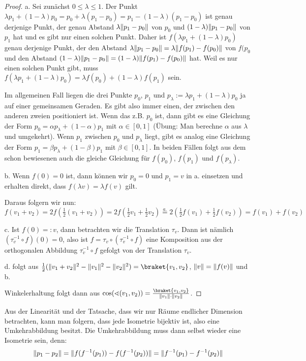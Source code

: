 \begin{proof}
a. Sei zunächst $0\leq \lambda\leq 1$. Der Punkt $\lambda p_1+(1-\lambda)p_0 = p_0+\lambda(p_1-p_0) = p_1-(1-\lambda)(p_1-p_0)$ ist genau derjenige Punkt, der genau Abstand $\lambda\lVert p_1-p_0\rVert$ von $p_0$ und $(1-\lambda)\lVert p_1-p_0\rVert$ von $p_1$ hat und es gibt nur einen solchen Punkt. Daher ist $f(\lambda p_1+(1-\lambda)p_0)$ genau derjenige Punkt, der den Abstand $\lambda\lVert p_1-p_0\rVert=\lambda\lVert f(p_1)-f(p_0)\rVert$ von $f(p_0$ und den Abstand $(1-\lambda)\lVert p_1-p_0\rVert = (1-\lambda)\lVert f(p_1)-f(p_0)\rVert$ hat. Weil es nur einen solchen Punkt gibt, muss $f(\lambda p_1+(1-\lambda)p_0) = \lambda f(p_0)+(1-\lambda)f(p_1)$ sein.

Im allgemeinen Fall liegen die drei Punkte $p_0$, $p_1$ und $p_\lambda:=\lambda p_1+(1-\lambda)p_0$ ja auf einer gemeinsamen Geraden. Es gibt also immer einen, der zwischen den anderen zweien positioniert ist. Wenn das z.B. $p_0$ ist, dann gibt es eine Gleichung der Form $p_0 = \alpha p_\lambda + (1-\alpha)p_1$ mit $\alpha\in [0,1]$ (Übung: Man berechne $\alpha$ aus $\lambda$ und umgekehrt). Wenn $p_1$ zwischen $p_0$ und $p_\lambda$ liegt, gibt es analog eine Gleichung der Form $p_1=\beta p_\lambda + (1-\beta)p_1$ mit $\beta\in[0,1]$. In beiden Fällen folgt aus dem schon bewiesenen auch die gleiche Gleichung für $f(p_0)$, $f(p_1)$ und $f(p_\lambda)$.

\medbreak
b. Wenn $f(0)=0$ ist, dann können wir $p_0=0$ und $p_1=v$ in a. einsetzen und erhalten direkt, dass $f(\lambda v)=\lambda f(v)$ gilt.

Daraus folgern wir nun:
\[f(v_1+v_2) = 2f(\tfrac{1}{2}(v_1+v_2)) = 2f(\tfrac{1}{2}v_1 + \tfrac{1}{2}v_2) \overset{a.}{=} 2(\tfrac{1}{2}f(v_1)+\tfrac{1}{2}f(v_2))=f(v_1)+f(v_2)\]

\medbreak
c. Ist $f(0)=:v$, dann betrachten wir die Translation $\tau_v$. Dann ist nämlich $(\tau_v^{-1}\circ f)(0) = 0$, also ist $f=\tau_v\circ(\tau_v^{-1}\circ f)$ eine Komposition aus der orthogonalen Abbildung $\tau_v^{-1}\circ f$ gefolgt von der Translation $\tau_v$.

\medbreak
d. folgt aus $\tfrac{1}{2}(\norm{v_1+v_2}^2-\norm{v_1}^2-\norm{v_2}^2)=\braket{v_1,v_2}$, $\lVert v\rVert=\lVert f(v)\rVert$ und b.

Winkelerhaltung folgt dann aus $\cos(\sphericalangle(v_1,v_2)) = \frac{\braket{v_1,v_2}}{\norm{v_1}\cdot\norm{v_2}}$.
\end{proof}

\begin{remark}
Aus der Linearität und der Tatsache, dass wir nur Räume endlicher Dimension betrachten, kann man folgern, dass jede Isometrie bijektiv ist, also eine Umkehrabbildung besitzt. Die Umkehrabbildung muss dann selbst wieder eine Isometrie sein, denn:
\[\lVert p_1-p_2\rVert = \lVert f(f^{-1}(p_1))-f(f^{-1}(p_2))\rVert = \lVert f^{-1}(p_1)-f^{-1}(p_2)\rVert\]
\end{remark}


